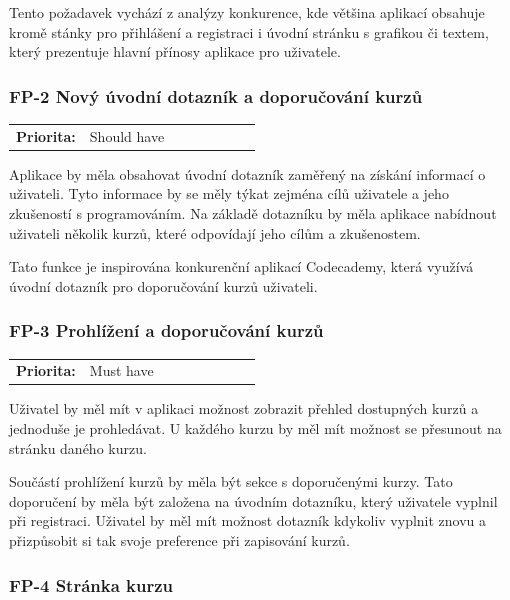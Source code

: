Tento požadavek vychází z analýzy konkurence, kde většina aplikací obsahuje kromě stánky pro přihlášení a registraci i úvodní stránku s grafikou či textem, který prezentuje hlavní přínosy aplikace pro uživatele.

\subsubsection{FP-2 Nový úvodní dotazník a doporučování kurzů}\label{sec:fp-onboarding}

\begin{tabular}{lp{0.7\linewidth}}
    \textbf{Priorita:} & Should have \\
\end{tabular}

Aplikace by měla obsahovat úvodní dotazník zaměřený na získání informací o uživateli. Tyto informace by se měly týkat zejména cílů uživatele a jeho zkušeností s programováním. Na základě dotazníku by měla aplikace nabídnout uživateli několik kurzů, které odpovídají jeho cílům a zkušenostem.

Tato funkce je inspirována konkurenční aplikací Codecademy, která využívá úvodní dotazník pro doporučování kurzů uživateli.

\subsubsection{FP-3 Prohlížení a doporučování kurzů}\label{sec:fp-course-browse}

\begin{tabular}{lp{0.7\linewidth}}
    \textbf{Priorita:} & Must have \\
\end{tabular}

Uživatel by měl mít v aplikaci možnost zobrazit přehled dostupných kurzů a jednoduše je prohledávat. U každého kurzu by měl mít možnost se přesunout na stránku daného kurzu.

Součástí prohlížení kurzů by měla být sekce s doporučenými kurzy. Tato doporučení by měla být založena na úvodním dotazníku, který uživatele vyplnil při registraci. Uživatel by měl mít možnost dotazník kdykoliv vyplnit znovu a přizpůsobit si tak svoje preference při zapisování kurzů.

\subsubsection{FP-4 Stránka kurzu}\label{sec:fp-course-page}

